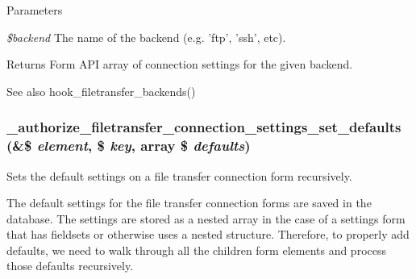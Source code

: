 \begin{DoxyParams}{Parameters}
\item[{\em \$backend}]The name of the backend (e.g. 'ftp', 'ssh', etc).\end{DoxyParams}
\begin{DoxyReturn}{Returns}
Form API array of connection settings for the given backend.
\end{DoxyReturn}
\begin{DoxySeeAlso}{See also}
hook\_\-filetransfer\_\-backends() 
\end{DoxySeeAlso}
\hypertarget{authorize_8inc_a094fe7ec2c912ecbf8057ae67a1f7e89}{
\subsubsection[{\_\-authorize\_\-filetransfer\_\-connection\_\-settings\_\-set\_\-defaults}]{\setlength{\rightskip}{0pt plus 5cm}\_\-authorize\_\-filetransfer\_\-connection\_\-settings\_\-set\_\-defaults (\&\$ {\em element}, \/  \$ {\em key}, \/  array \$ {\em defaults})}}
\label{authorize_8inc_a094fe7ec2c912ecbf8057ae67a1f7e89}
Sets the default settings on a file transfer connection form recursively.

The default settings for the file transfer connection forms are saved in the database. The settings are stored as a nested array in the case of a settings form that has fieldsets or otherwise uses a nested structure. Therefore, to properly add defaults, we need to walk through all the children form elements and process those defaults recursively.


